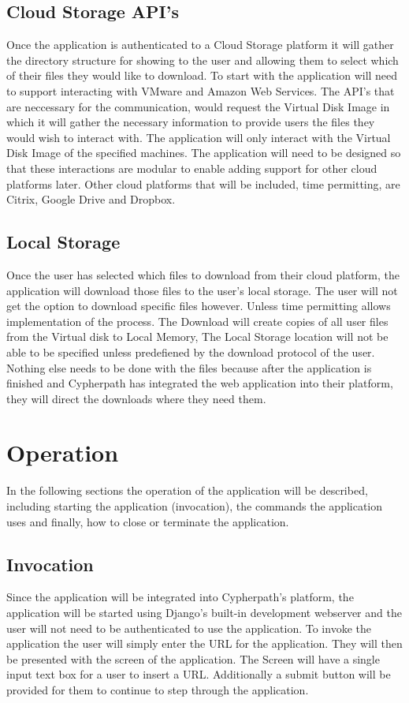 \documentclass{article}
\begin{document}
        \subsection{Cloud Storage API's}
        Once the application is authenticated to a Cloud Storage platform it will gather the directory structure for showing to the user and allowing them to select
        which of their files they would like to download. To start with the application will need to support interacting with VMware and Amazon Web Services. The API's
        that are neccessary for the communication, would request the Virtual Disk Image in which it will gather the necessary information to provide users the files they 
        would wish to interact with. The application will only interact with the Virtual Disk Image of the specified machines. The application will need to be designed so 
        that these interactions are modular to enable adding support for other cloud platforms later. Other cloud platforms that will be included, time permitting, are 
        Citrix, Google Drive and Dropbox.


        \subsection{Local Storage}
        Once the user has selected which files to download from their cloud platform, the application will download those
        files to the user's local storage. The user will not get the option to download specific files however. Unless time permitting
        allows implementation of the process. The Download will create copies of all user files from the Virtual disk to Local Memory, 
        The Local Storage location will not be able to be specified unless predefiened by the download protocol of the user. Nothing else 
        needs to be done with the files because after the application is finished and Cypherpath has integrated the web application into 
        their platform, they will direct the downloads where they need them.


    \section{Operation}
    In the following sections the operation of the application will be described, including starting the application
    (invocation), the commands the application uses and finally, how to close or terminate the application.

        \subsection{Invocation}
        Since the application will be integrated into Cypherpath's platform, the application will be started using Django's built-in development webserver and
        the user will not need to be authenticated to use the application. To invoke the application the user will simply enter the URL for the application.
        They will then be presented with the screen of the application. The Screen will have a single input text box for a user to insert a URL. Additionally 
        a submit button will be provided for them to continue to step through the application. 
\end{document}
